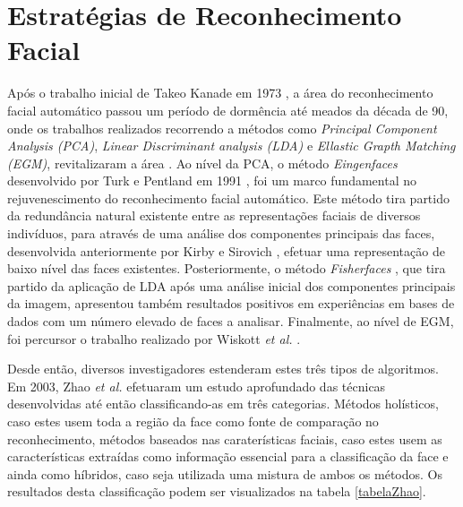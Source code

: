 \section{Estratégias de Reconhecimento Facial}\label{sec:estratégias}
Após o trabalho inicial de Takeo Kanade em 1973 \citep{Kanade1973}, a área do reconhecimento facial automático passou um período de dormência até meados da década de 90, onde os trabalhos realizados recorrendo a métodos como \textit{Principal Component Analysis (PCA)}, \textit{Linear Discriminant analysis (LDA)} e \textit{Ellastic Grapth Matching (EGM)}, revitalizaram a área \citep{Chellappa2010}. Ao nível da PCA, o método
 \textit{Eingenfaces} desenvolvido por Turk e Pentland em 1991 \cite{Turk1991}, foi um marco fundamental no rejuvenescimento do reconhecimento facial automático. Este método tira partido da redundância natural existente entre as representações faciais de diversos indivíduos, para através de uma análise dos componentes principais das faces, desenvolvida anteriormente por Kirby e Sirovich  \cite{Kirby1990}, efetuar uma representação de baixo nível das faces existentes. Posteriormente, o método \textit{Fisherfaces} \cite{Belhumeur1997, Etemad1997, Zhao1998}, que tira partido da aplicação de LDA após uma análise inicial dos componentes principais da imagem, apresentou também resultados positivos em experiências em bases de dados com um número elevado de faces a analisar. Finalmente, ao nível de EGM, foi percursor o trabalho realizado por Wiskott \textit{et al.} \cite{wiskott1997face}. 
 
Desde então, diversos investigadores estenderam estes três tipos de algoritmos. Em 2003, Zhao \textit{et al.} \citep{Zhao2003} efetuaram um estudo aprofundado das técnicas desenvolvidas até então classificando-as em três categorias. Métodos holísticos, caso estes usem toda a região da face como fonte de comparação no reconhecimento, métodos baseados nas caraterísticas faciais, caso estes usem as características extraídas como informação essencial para a classificação da face e ainda como híbridos, caso seja utilizada uma mistura de ambos os métodos. Os resultados desta classificação podem ser visualizados na tabela \ref{tabelaZhao}.

